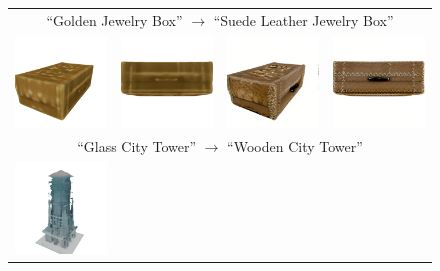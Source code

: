 \begin{figure}
    \centering
    \setlength{\tabcolsep}{1pt}
    {\small
    \begin{tabular}{cccc}
        \multicolumn{4}{c}{``Golden Jewelry Box'' $\longrightarrow$ ``Suede Leather Jewelry Box''} \\
        \includegraphics[width=0.22\linewidth]{images/editings/appearance_edit/box/jewls_tile_0.png} &
        \includegraphics[width=0.22\linewidth]{images/editings/appearance_edit/box/jewls_tile_1.png} &
        \includegraphics[width=0.22\linewidth]{images/editings/appearance_edit/box/jewlery_jewlery_box_2_75_steps_batch_0_a_suede_leather_jewlry_box_tile_0.png} &
        \includegraphics[width=0.22\linewidth]{images/editings/appearance_edit/box/jewlery_jewlery_box_2_75_steps_batch_0_a_suede_leather_jewlry_box_tile_1.png} \\
        \multicolumn{4}{c}{``Glass City Tower'' $\longrightarrow$ ``Wooden City Tower''} \\
        \includegraphics[width=0.22\linewidth]{images/editings/appearance_edit/tower/glass_city_tower_tile_0.png} &

\end{tabular}}
\end{figure}
